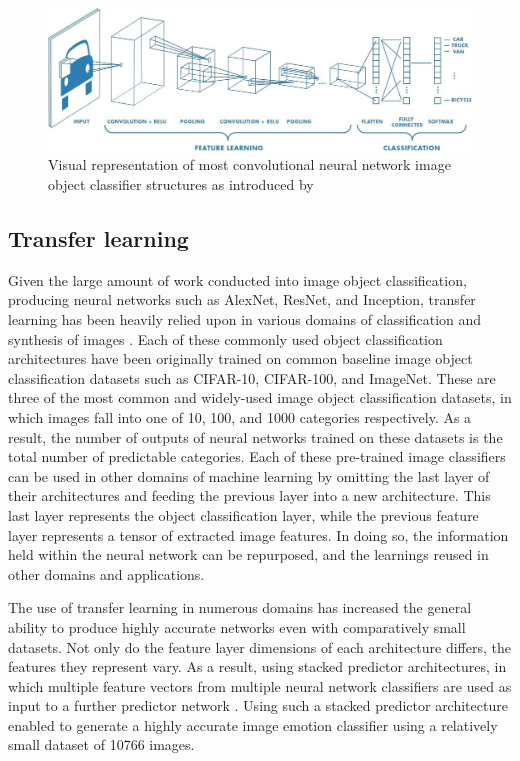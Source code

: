\documentclass{article}
\begin{document}
\begin{figure}[h!]
	\includegraphics[width=\textwidth]{images/convolutional-neural-network.jpg}
	\caption{Visual representation of most convolutional neural network image object classifier structures as introduced by \citet{krizhevsky2012imagenet}}
	\label{fig:CNN}
\end{figure}

\subsection{Transfer learning}

Given the large amount of work conducted into image object classification, producing neural networks such as AlexNet, ResNet, and Inception, transfer learning has been heavily relied upon in various domains of classification and synthesis of images \citep{pan2009survey}.
Each of these commonly used object classification architectures have been originally trained on common baseline image object classification datasets such as CIFAR-10, CIFAR-100, and ImageNet.
These are three of the most common and widely-used image object classification datasets, in which images fall into one of 10, 100, and 1000 categories respectively.
As a result, the number of outputs of neural networks trained on these datasets is the total number of predictable categories.
Each of these pre-trained image classifiers can be used in other domains of machine learning by omitting the last layer of their architectures and feeding the previous layer into a new architecture.
This last layer represents the object classification layer, while the previous feature layer represents a tensor of extracted image features.
In doing so, the information held within the neural network can be repurposed, and the learnings reused in other domains and applications.

The use of transfer learning in numerous domains has increased the general ability to produce highly accurate networks even with comparatively small datasets.
Not only do the feature layer dimensions of each architecture differs, the features they represent vary.
As a result, using stacked predictor architectures, in which multiple feature vectors from multiple neural network classifiers are used as input to a further predictor network \citep{kim2018building}.
Using such a stacked predictor architecture enabled \citet{kim2018building} to generate a highly accurate image emotion classifier using a relatively small dataset of 10766 images.
\end{document}
